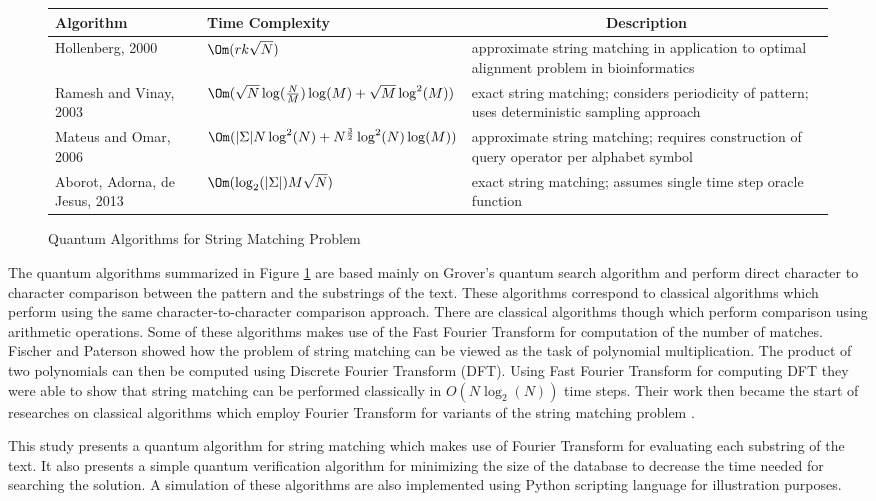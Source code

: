 \begin{figure}
	\begin{center}
		\begin{tabular}{| p{3cm} | p{4cm} | p{5cm} |}
			\hline
			\textbf{Algorithm}	 & \textbf{Time Complexity} & \multicolumn{1}{c|}{\textbf{Description}} \\
			\hline
			Hollenberg, 2000 & $\Om(rk\sqrt{N})$ & approximate string matching in application to optimal alignment problem in bioinformatics \\
			\hline
			Ramesh and Vinay, 2003 & $\Om(\sqrt{N}\log(\frac{N}{M})\log(M) + \sqrt{M}\log^2(M))$  & exact string matching; considers periodicity of pattern; uses deterministic sampling approach\\
			\hline
			Mateus and Omar, 2006 & $\Om(\vert \Sigma \vert N\log^2(N) + N^{\frac{3}{2}}\log^2(N)\log(M))$ & approximate string matching; requires construction of query operator per alphabet symbol\\
			\hline
			Aborot, Adorna, de Jesus, 2013 & $\Om(\log_2(\vert \Sigma \vert)M\sqrt{N})$ & exact string matching; assumes single time step oracle function\\
			\hline
		\end{tabular}		
	\end{center}
	\caption{Quantum Algorithms for String Matching Problem}
	\label{qalgos}
\end{figure}

The quantum algorithms summarized in Figure \ref{qalgos} are based mainly on Grover's quantum search algorithm and perform direct character to character comparison between the pattern and the substrings of the text. These algorithms correspond to classical algorithms which perform using the same character-to-character comparison approach. There are classical algorithms though which perform comparison using arithmetic operations. Some of these algorithms makes use of the Fast Fourier Transform for computation of the number of matches. Fischer and Paterson \cite{Fischer1974} showed how the problem of string matching can be viewed as the task of polynomial multiplication. The product of two polynomials can then be computed using Discrete Fourier Transform (DFT). Using Fast Fourier Transform for computing DFT they were able to show that string matching can be performed classically in $O(N\log_2(N))$ time steps. Their work then became the start of researches on classical algorithms which employ Fourier Transform for variants of the string matching problem \cite{Schoenmeyr2005,Fredriksson2009,Baba2010}.

This study presents a quantum algorithm for string matching which makes use of Fourier Transform for evaluating each substring of the text. It also presents a simple quantum verification algorithm for minimizing the size of the database to decrease the time needed for searching the solution. A simulation of these algorithms are also implemented using Python scripting language for illustration purposes.
